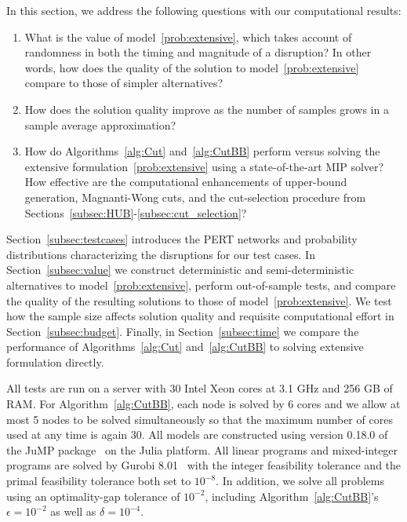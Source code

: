 \documentclass[11pt]{article}
\begin{document}
	In this section, we address the following questions with our computational results:
	\begin{enumerate}
		\item What is the value of model~\eqref{prob:extensive}, which takes account of randomness in both the timing and magnitude of a disruption? In other words, 
		how does the quality of the solution to model~\eqref{prob:extensive} compare to those of simpler alternatives?
		\item How does the solution quality improve as the number of samples grows in a sample average approximation? 
		\item How do Algorithms~\ref{alg:Cut} and~\ref{alg:CutBB} perform versus solving the extensive formulation~\eqref{prob:extensive} using a state-of-the-art MIP solver? How effective are the computational enhancements of upper-bound generation, Magnanti-Wong cuts, and the cut-selection procedure from Sections~\ref{subsec:HUB}-\ref{subsec:cut_selection}?
	\end{enumerate}
	Section~\ref{subsec:testcases} introduces the PERT networks and probability distributions characterizing the disruptions for our test cases. In Section~\ref{subsec:value} we construct deterministic and semi-deterministic alternatives to model~\eqref{prob:extensive}, perform out-of-sample tests, and compare the quality of the resulting solutions to those of model~\eqref{prob:extensive}. We test how the sample size affects solution quality and requisite computational effort in Section~\ref{subsec:budget}. Finally, in Section~\ref{subsec:time} we compare the performance of Algorithms~\ref{alg:Cut} and~\ref{alg:CutBB} to solving extensive formulation directly.

	All tests are run on a server with 30 Intel Xeon cores at 3.1 GHz and 256 GB of RAM. For Algorithm~\ref{alg:CutBB}, each node is solved by 6 cores and we allow at most 5 nodes to be solved simultaneously so that the maximum number of cores used at any time is again 30. All models are constructed using version 0.18.0 of the JuMP package~\citep{DunningHuchetteLubin2017} on the Julia platform. All linear programs and mixed-integer programs are solved by Gurobi 8.01~\citep{gurobi2016} with the integer feasibility tolerance and the primal feasibility tolerance both set to \(10^{-8}\). In addition, we solve all problems using an optimality-gap tolerance of $10^{-2}$, including Algorithm~\ref{alg:CutBB}'s $\epsilon=10^{-2}$ as well as $\delta=10^{-4}$.
	
\end{document}
